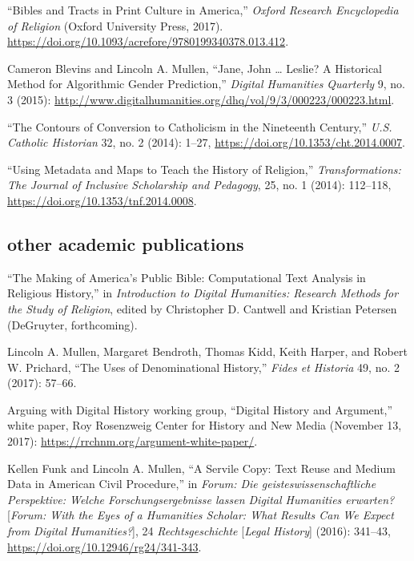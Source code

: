 \documentclass[11pt]{article}
\begin{document}
``Bibles and Tracts in Print Culture in America,'' \emph{Oxford Research Encyclopedia of Religion} (Oxford University Press, 2017). \url{ https://doi.org/10.1093/acrefore/9780199340378.013.412}.

Cameron Blevins and Lincoln A. Mullen, ``Jane, John \ldots{} Leslie? A Historical Method for Algorithmic Gender Prediction,'' \emph{Digital Humanities Quarterly} 9, no. 3 (2015): \url{http://www.digitalhumanities.org/dhq/vol/9/3/000223/000223.html}.

``The Contours of Conversion to Catholicism in the Nineteenth Century,'' \emph{U.S. Catholic Historian} 32, no. 2 (2014): 1--27, \url{https://doi.org/10.1353/cht.2014.0007}.

``Using Metadata and Maps to Teach the History of Religion,'' \emph{Transformations: The Journal of Inclusive Scholarship and Pedagogy}, 25, no. 1 (2014): 112--118, \url{https://doi.org/10.1353/tnf.2014.0008}.


\subsection{other academic publications}\label{other-academic}


``The Making of America's Public Bible: Computational Text Analysis in 
Religious History,'' in \emph{Introduction to Digital Humanities: Research 
Methods for the Study of Religion}, edited by Christopher D. Cantwell and 
Kristian Petersen (DeGruyter, forthcoming).

Lincoln A. Mullen, Margaret Bendroth, Thomas Kidd, Keith Harper, and Robert W. 
Prichard, ``The Uses of Denominational History,'' \emph{Fides et Historia} 49, 
no. 2 (2017): 57--66.

Arguing with Digital History working group, ``Digital History and Argument,'' 
white paper, Roy Rosenzweig Center for History and New Media (November 13, 
2017): \url{https://rrchnm.org/argument-white-paper/}.

Kellen Funk and Lincoln A. Mullen, ``A Servile Copy: Text Reuse and Medium Data 
in American Civil Procedure,'' in \emph{Forum: Die geisteswissenschaftliche 
  Perspektive: Welche Forschungsergebnisse lassen Digital Humanities 
  erwarten?} [\emph{Forum: With the Eyes of a Humanities Scholar: What Results 
  Can We Expect from Digital Humanities?}], 24 \emph{Rechtsgeschichte} 
[\emph{Legal History}] (2016): 341--43, 
\url{https://doi.org/10.12946/rg24/341-343}.
\end{document}
